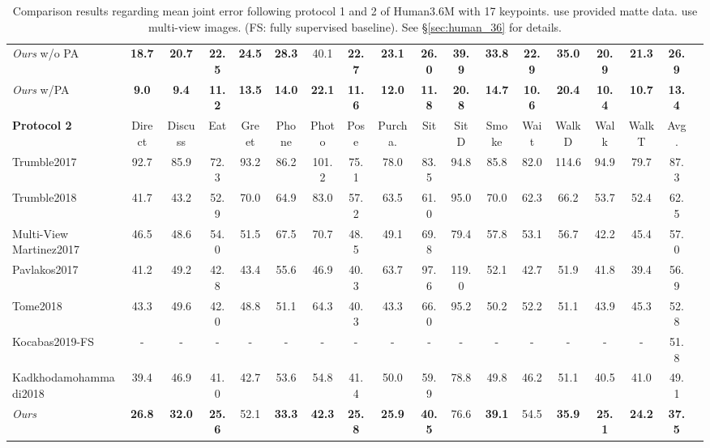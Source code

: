 \documentclass[10pt,twocolumn,letterpaper]{article}
\begin{document}
\begin{table*}
\begin{center}
{\begin{tabular}{ l c c c c c c c c c c c c c c c c c}
\emph{Ours} w/o PA  & \textbf{18.7}&\textbf{20.7}&\textbf{22.5}&\textbf{24.5}&\textbf{28.3}&40.1&\textbf{22.7}&\textbf{23.1}&\textbf{26.0}&\textbf{39.9}&\textbf{33.8}&\textbf{22.9}&\textbf{35.0}& \textbf{20.9} &\textbf{21.3}&\textbf{26.9}  \\
\emph{Ours} w/PA  & \textbf{9.0}&\textbf{9.4}&\textbf{11.2}&\textbf{13.5}&\textbf{14.0}&\textbf{22.1}&\textbf{11.6}&\textbf{12.0}&\textbf{11.8}&\textbf{20.8}&\textbf{14.7}&\textbf{10.6}&\textbf{20.4}&\textbf{10.4}& \textbf{10.7} &\textbf{13.4}  \\
\hline
\textbf{Protocol 2} & Direct & Discuss & Eat & Greet & Phone& Photo & Pose  & Purcha. & Sit & SitD &Smoke &Wait &WalkD&Walk& WalkT & Avg.\\
\hline
Trumble2017  \cite{trumble2017total} & 92.7 & 85.9 & 72.3 & 93.2 & 86.2 & 101.2 & 75.1 & 78.0 & 83.5&94.8 & 85.8& 82.0 & 114.6 & 94.9 & 79.7& 87.3 \\ 
Trumble2018   \cite{trumble2018deep}  & 41.7 & 43.2 & 52.9 & 70.0 & 64.9 & 83.0 & 57.2 & 63.5 & 61.0 & 95.0 & 70.0 & 62.3 & 66.2 & 53.7 & 52.4 & 62.5  \\
Multi-View Martinez2017 \cite{martinez2017}\cite{tome2018rethinking} &46.5 &48.6 &54.0 &51.5 &67.5 &70.7 &48.5 &49.1 &69.8 &79.4 &57.8 &53.1 &56.7 &42.2 &45.4 &57.0 \\
Pavlakos2017\cite{PavlakosZDD17} & 41.2 &49.2 &42.8 &43.4 &55.6 &46.9 &40.3 &63.7 &97.6 &119.0 &52.1 &42.7 &51.9 &41.8 &39.4 &56.9\\
Tome2018 \cite{tome2018rethinking} &43.3 &49.6 &42.0 &48.8 &51.1 &64.3 &40.3 &43.3 &66.0 &95.2 &50.2 &52.2 &51.1 &43.9 &45.3 &52.8\\
Kocabas2019-FS\cite{kocabas2019self}&-&-&-&-&-&-&-&-&-&-&-&-&-&-&-&51.8\\
Kadkhodamohammadi2018\cite{Abdolrahim2018} &39.4 &46.9 &41.0 &42.7& 53.6 &54.8 &41.4& 50.0 &59.9 &78.8 &49.8 &46.2 &51.1 &40.5 &41.0 &49.1\\
\emph{Ours}   &\textbf{26.8} &\textbf{32.0} &\textbf{25.6} &52.1 &\textbf{33.3} &\textbf{42.3} &\textbf{25.8}& \textbf{25.9} &\textbf{40.5} &76.6 &\textbf{39.1} &54.5 &\textbf{35.9} &\textbf{25.1} &\textbf{24.2} &\textbf{37.5}\\


\hline
\end{tabular}}
\end{center}
\caption{Comparison results regarding mean joint error following protocol 1 and 2 of Human3.6M with 17 keypoints.  use provided matte data.  use multi-view images. (FS: fully supervised baseline). See \S\ref{sec:human_36} for details.}
\label{tab:human}
\vspace*{-14pt}
\end{table*}
\end{document}
